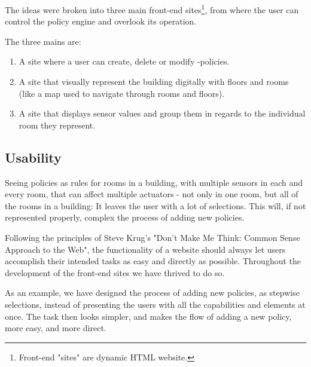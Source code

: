 The ideas were broken into three main front-end sites\footnote{Front-end "sites" are dynamic HTML website.}, from where the user can control the policy engine and overlook its operation.

The three mains are:
\begin{enumerate}
\item A site where a user can create, delete or modify -policies.
\item A site that visually represent the building digitally with floors and rooms (like a map used to navigate through rooms and floors).
\item A site that displays sensor values and group them in regards to the individual room they represent.
\end{enumerate}
	

\subsection{Usability}
Seeing policies as rules for rooms in a building, with multiple sensors in each and every room, that can affect multiple actuators - not only in one room, but all of the rooms in a building: It leaves the user with a lot of selections. 
This will, if not represented properly, complex the process of adding new policies.

Following the principles of Steve Krug's "Don't Make Me Think: Common Sense Approach to the Web"\cite{Krug:2005:DMM:1051204}, the functionality of a website should always let users accomplish their intended tasks as easy and directly as possible.
Throughout the development of the front-end sites we have thrived to do so.

As an example, we have designed the process of adding new policies, as stepwise selections, instead of presenting the users with all the capabilities and elements at once.
The task then looks simpler, and makes the flow of  adding a new policy, more easy, and more direct.

